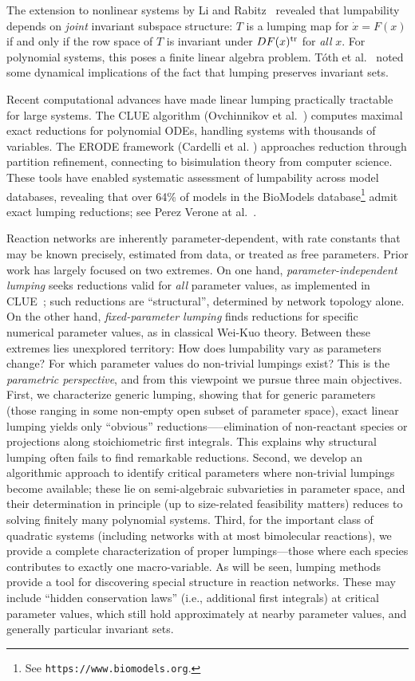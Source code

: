 \documentclass{article}
\begin{document}
The extension to nonlinear systems by Li and Rabitz~\cite{LR1989} revealed that lumpability 
depends on \emph{joint} invariant subspace structure: $T$ is a lumping map for 
$\dot{x} = F(x)$ if and only if the row space of $T$ is invariant under $DF(x)^{\rm tr}$ for 
\emph{all} $x$. For polynomial systems, this poses a finite linear algebra problem. 
T\'oth et al.~\cite{TLRT1997} noted some dynamical implications of the fact that lumping preserves 
invariant sets.

Recent computational advances have made linear lumping practically tractable for large systems. 
The CLUE algorithm (Ovchinnikov et al.\ \cite{OVPT2021}) computes maximal exact reductions for polynomial ODEs,
handling systems with thousands of variables. The ERODE framework (Cardelli et al. \cite{CardelliTTV2017}) 
approaches reduction through partition refinement, connecting to bisimulation theory from 
computer science. These tools have enabled systematic assessment of lumpability across 
model databases, revealing that over 64\% of models in the BioModels database\footnote{See {\tt https://www.biomodels.org}.} admit exact lumping 
reductions; see Perez Verone at al.\ \cite{PerezVerona2021}.

Reaction networks are 
inherently parameter-dependent, with rate constants that may be known precisely, estimated 
from data, or treated as free parameters. Prior work has largely focused on two extremes.
On one hand, \emph{parameter-independent lumping} seeks reductions valid for \emph{all} 
parameter values, as implemented in CLUE~\cite{OVPT2021}; such reductions are 
``structural'', determined by network topology alone.  On the other hand, 
\emph{fixed-parameter lumping} finds reductions for specific numerical parameter values, 
as in classical Wei-Kuo theory. Between these extremes lies unexplored territory: How does 
lumpability vary as parameters change? For which parameter values do non-trivial lumpings 
exist? This is the {\it parametric perspective}, and from this viewpoint we pursue three main objectives. First, we 
characterize generic lumping, showing that for generic parameters (those ranging in some non-empty
open subset of parameter space), exact linear lumping yields only ``obvious'' reductions—--elimination of 
non-reactant species or projections along stoichiometric first integrals. This explains 
why structural lumping often fails to find remarkable reductions. Second, we develop an 
algorithmic approach to identify critical parameters where non-trivial lumpings become 
available; these lie on semi-algebraic subvarieties in parameter space, and their determination 
in principle (up to size-related feasibility matters) reduces to solving finitely many polynomial systems. Third, for the important class of 
quadratic systems (including networks with at most bimolecular reactions), we provide a complete characterization of proper lumpings—those where each species contributes to exactly one 
macro-variable.
As will be seen, lumping methods provide a tool for discovering special structure in reaction networks. These may include ``hidden conservation laws'' (i.e., additional first integrals) at critical parameter values, which still hold approximately at nearby parameter values, and generally particular invariant sets. 
\end{document}
